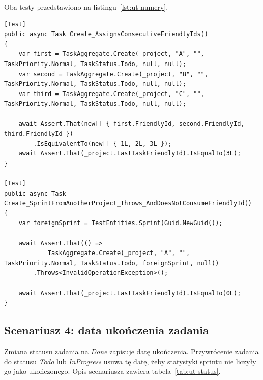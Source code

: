 Oba testy przedstawiono na listingu~\ref{lst:ut-numery}.

\begin{lstlisting}[basicstyle=\footnotesize\ttfamily, captionpos=t, caption={Testy nadawania numerów zadań}, label={lst:ut-numery}]
[Test]
public async Task Create_AssignsConsecutiveFriendlyIds()
{
    var first = TaskAggregate.Create(_project, "A", "", TaskPriority.Normal, TaskStatus.Todo, null, null);
    var second = TaskAggregate.Create(_project, "B", "", TaskPriority.Normal, TaskStatus.Todo, null, null);
    var third = TaskAggregate.Create(_project, "C", "", TaskPriority.Normal, TaskStatus.Todo, null, null);

    await Assert.That(new[] { first.FriendlyId, second.FriendlyId, third.FriendlyId })
        .IsEquivalentTo(new[] { 1L, 2L, 3L });
    await Assert.That(_project.LastTaskFriendlyId).IsEqualTo(3L);
}

[Test]
public async Task Create_SprintFromAnotherProject_Throws_AndDoesNotConsumeFriendlyId()
{
    var foreignSprint = TestEntities.Sprint(Guid.NewGuid());

    await Assert.That(() =>
            TaskAggregate.Create(_project, "A", "", TaskPriority.Normal, TaskStatus.Todo, foreignSprint, null))
        .Throws<InvalidOperationException>();

    await Assert.That(_project.LastTaskFriendlyId).IsEqualTo(0L);
}
\end{lstlisting}

\subsection{Scenariusz 4: data ukończenia zadania}
Zmiana statusu zadania na \textit{Done} zapisuje datę ukończenia. Przywrócenie zadania do statusu \textit{Todo} lub
\textit{InProgress} usuwa tę datę, żeby statystyki sprintu nie liczyły go jako ukończonego. Opis scenariusza zawiera
tabela~\ref{tab:ut-status}.

